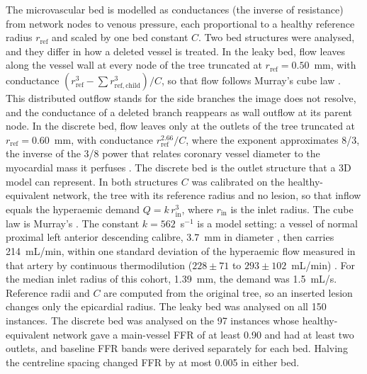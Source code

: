 \documentclass[journal]{IEEEtran}
\begin{document}
The microvascular bed is modelled as conductances (the inverse of resistance) from network nodes to venous pressure,
each proportional to a healthy reference radius $r_\mathrm{ref}$ and scaled by one bed constant $C$. Two bed
structures were analysed, and they differ in how a deleted vessel is treated. In the leaky bed, flow leaves along
the vessel wall at every node of the tree truncated at $r_\mathrm{ref} = 0.50$~mm, with conductance
$(r_\mathrm{ref}^3 - \sum r_{\mathrm{ref},\mathrm{child}}^3)/C$, so that flow follows Murray's cube law
\cite{murray1926}. This distributed outflow stands for the side branches the image does not resolve, and the
conductance of a deleted branch reappears as wall outflow at its parent node. In the discrete bed, flow leaves only
at the outlets of the tree truncated at $r_\mathrm{ref} = 0.60$~mm, with conductance $r_\mathrm{ref}^{2.66}/C$,
where the exponent approximates 8/3, the inverse of the 3/8 power that relates coronary vessel diameter to the
myocardial mass it perfuses \cite{choy2008}. The
discrete bed is the outlet structure that a 3D model can represent. In both structures $C$ was calibrated on the
healthy-equivalent network, the tree with its reference radius and no lesion, so that inflow equals the hyperaemic
demand $Q = k\,r_\mathrm{in}^3$, where $r_\mathrm{in}$ is the inlet radius. The cube law is Murray's
\cite{murray1926}. The constant $k = 562$~s$^{-1}$ is a model setting: a vessel of normal proximal left anterior
descending calibre, 3.7~mm in diameter \cite{dodge1992}, then carries 214~mL/min, within one standard deviation of
the hyperaemic flow measured in that artery by continuous thermodilution ($228 \pm 71$ to $293 \pm 102$~mL/min)
\cite{fournier2021}. For the median inlet radius of this cohort, 1.39~mm, the demand was 1.5~mL/s. Reference radii and
$C$ are computed from the original tree, so an inserted lesion changes only the epicardial radius. The leaky bed was
analysed on all 150 instances. The discrete bed was analysed on the 97 instances whose healthy-equivalent network
gave a main-vessel FFR of at least 0.90 and had at least two outlets, and baseline FFR bands were derived separately
for each bed. Halving the centreline spacing changed FFR by at most 0.005 in either bed.
\end{document}
